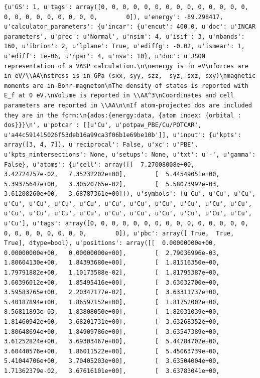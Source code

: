 \documentclass[number, sort&compress, review, 12pt]{elsarticle}
\begin{document}
\begin{verbatim}
{u'GS': 1, u'tags': array([0, 0, 0, 0, 0, 0, 0, 0, 0, 0, 0, 0, 0, 0,
0, 0, 0, 0, 0, 0, 0, 0, 0,        0]), u'energy': -89.298417,
u'calculator_parameters': {u'incar': {u'encut': 400.0, u'doc': u'INCAR
parameters', u'prec': u'Normal', u'nsim': 4, u'isif': 3, u'nbands':
160, u'ibrion': 2, u'lplane': True, u'ediffg': -0.02, u'ismear': 1,
u'ediff': 1e-06, u'npar': 4, u'nsw': 10}, u'doc': u'JSON
representation of a VASP calculation.\n\nenergy is in eV\nforces are
in eV/\\AA\nstress is in GPa (sxx, syy, szz,  syz, sxz, sxy)\nmagnetic
moments are in Bohr-magneton\nThe density of states is reported with
E_f at 0 eV.\nVolume is reported in \\AA^3\nCoordinates and cell
parameters are reported in \\AA\n\nIf atom-projected dos are included
they are in the form:\n{ados:{energy:data, {atom index: {orbital :
dos}}}\n', u'potcar': [[u'Cu', u'potpaw_PBE/Cu/POTCAR',
u'a44c591415026f53deb16a99ca3f06b1e69be10b']], u'input': {u'kpts':
array([3, 4, 7]), u'reciprocal': False, u'xc': u'PBE',
u'kpts_nintersections': None, u'setups': None, u'txt': u'-', u'gamma':
False}, u'atoms': {u'cell': array([[  7.27008008e+00,
3.42724757e-02,   7.35232202e+00],        [  5.44549051e+00,
5.39375647e+00,   3.30520765e-02],        [  5.58073992e-03,
3.61208260e+00,   3.68787361e+00]]), u'symbols': [u'Cu', u'Cu', u'Cu',
u'Cu', u'Cu', u'Cu', u'Cu', u'Cu', u'Cu', u'Cu', u'Cu', u'Cu', u'Cu',
u'Cu', u'Cu', u'Cu', u'Cu', u'Cu', u'Cu', u'Cu', u'Cu', u'Cu', u'Cu',
u'Cu'], u'tags': array([0, 0, 0, 0, 0, 0, 0, 0, 0, 0, 0, 0, 0, 0, 0,
0, 0, 0, 0, 0, 0, 0, 0,        0]), u'pbc': array([ True,  True,
True], dtype=bool), u'positions': array([[  0.00000000e+00,
0.00000000e+00,   0.00000000e+00],        [  2.79036996e-03,
1.80604130e+00,   1.84393680e+00],        [  1.81516350e+00,
1.79791882e+00,   1.10173588e-02],        [  1.81795387e+00,
3.60396012e+00,   1.85495416e+00],        [  3.63032700e+00,
3.59583765e+00,   2.20347177e-02],        [  3.63311737e+00,
5.40187894e+00,   1.86597152e+00],        [  1.81752002e+00,
8.56811893e-03,   1.83808050e+00],        [  1.82031039e+00,
1.81460942e+00,   3.68201731e+00],        [  3.63268352e+00,
1.80648694e+00,   1.84909786e+00],        [  3.63547389e+00,
3.61252824e+00,   3.69303467e+00],        [  5.44784702e+00,
3.60440576e+00,   1.86011522e+00],        [  5.45063739e+00,
5.41044706e+00,   3.70405203e+00],        [  3.63504004e+00,
1.71362379e-02,   3.67616101e+00],        [  3.63783041e+00,

\end{verbatim}
\end{document}
